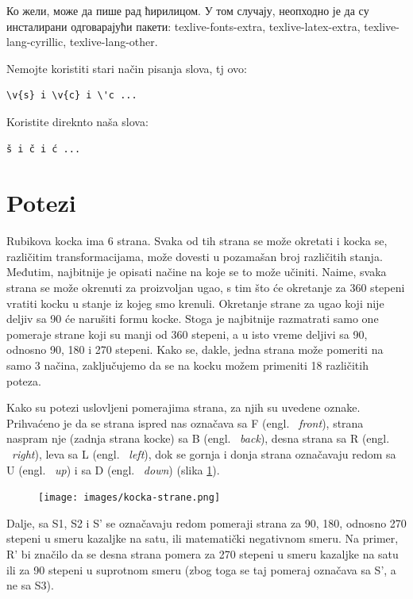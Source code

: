\documentclass[a4paper]{article}
\begin{document}
Ко жели, може да пише рад ћирилицом. У том случају, неопходно је да су инсталирани одговарајући пакети: texlive-fonts-extra, texlive-latex-extra, texlive-lang-cyrillic, texlive-lang-other. 

Nemojte koristiti stari način pisanja slova, tj ovo:
\begin{verbatim}
\v{s} i \v{c} i \'c ...
\end{verbatim}
Koristite direknto naša slova:	
\begin{verbatim}
š i č i ć ... 
\end{verbatim}


\section{Potezi}	
\label{sec:potezi}

Rubikova kocka ima 6 strana. Svaka od tih strana se može okretati i kocka se, različitim transformacijama, može dovesti u pozamašan broj različitih stanja. Međutim, najbitnije je opisati načine na koje se to može učiniti. Naime, svaka strana se može okrenuti za proizvoljan ugao, s tim što će okretanje za 360 stepeni vratiti kocku u stanje iz kojeg smo krenuli. Okretanje strane za ugao koji nije deljiv sa 90 će narušiti formu kocke. Stoga je najbitnije razmatrati samo one pomeraje strane koji su manji od 360 stepeni, a u isto vreme deljivi sa 90, odnosno 90, 180 i 270 stepeni. Kako se, dakle, jedna strana može pomeriti na samo 3 načina, zaključujemo da se na kocku možem primeniti 18 različitih poteza.

Kako su potezi uslovljeni pomerajima strana, za njih su uvedene oznake. Prihvaćeno je da se strana ispred nas označava sa F (engl. ~{\em front}), strana naspram nje (zadnja strana kocke) sa B (engl. ~{\em back}), desna strana sa R (engl. ~{\em right}), leva sa L (engl. ~{\em left}), dok se gornja i donja strana označavaju redom sa U (engl. ~{\em up}) i sa D (engl. ~{\em down}) (slika \ref{fig:stranekocke}).

\begin{figure}
        \centering\texttt{[image: images/kocka-strane.png]} 
        \caption{}
        \label{fig:stranekocke}
\end{figure}

Dalje, sa S1, S2 i S' se označavaju redom pomeraji strana za 90, 180, odnosno 270 stepeni u smeru kazaljke na satu, ili matematički negativnom smeru. Na primer, R' bi značilo da se desna strana pomera za 270 stepeni u smeru kazaljke na satu ili za 90 stepeni u suprotnom smeru (zbog toga se taj pomeraj označava sa S', a ne sa S3).
\end{document}
